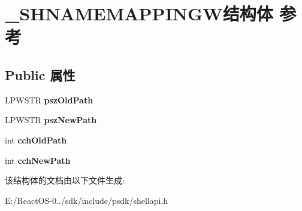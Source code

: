 \hypertarget{struct___s_h_n_a_m_e_m_a_p_p_i_n_g_w}{}\section{\+\_\+\+S\+H\+N\+A\+M\+E\+M\+A\+P\+P\+I\+N\+G\+W结构体 参考}
\label{struct___s_h_n_a_m_e_m_a_p_p_i_n_g_w}
\subsection*{Public 属性}
\begin{DoxyCompactItemize}
\item 
\mbox{\label{struct___s_h_n_a_m_e_m_a_p_p_i_n_g_w_a5437a941bd464e8f393b011e3b38c57c}} 
L\+P\+W\+S\+TR {\bfseries psz\+Old\+Path}
\item 
\mbox{\label{struct___s_h_n_a_m_e_m_a_p_p_i_n_g_w_a55e2a1427e084899e59122e94ed6e97d}} 
L\+P\+W\+S\+TR {\bfseries psz\+New\+Path}
\item 
\mbox{\label{struct___s_h_n_a_m_e_m_a_p_p_i_n_g_w_a28b4ff65b63f56d65700f9c93b38c190}} 
int {\bfseries cch\+Old\+Path}
\item 
\mbox{\label{struct___s_h_n_a_m_e_m_a_p_p_i_n_g_w_a61df445f8edec251988c41d8ebc57b02}} 
int {\bfseries cch\+New\+Path}
\end{DoxyCompactItemize}


该结构体的文档由以下文件生成\+:\begin{DoxyCompactItemize}
\item 
E\+:/\+React\+O\+S-\/0../sdk/include/psdk/shellapi.\+h\end{DoxyCompactItemize}

